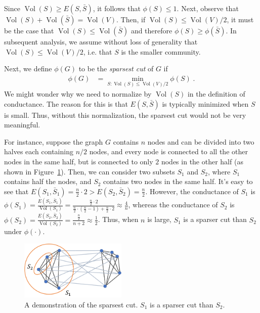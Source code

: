Since $\operatorname{Vol}(S) \geq E(S, \bar{S})$, it follows that $\phi(S) \leq 1$. Next, observe that $\operatorname{Vol}(S) + \operatorname{Vol}(\bar{S}) = \operatorname{Vol}(V)$. Then, if $\operatorname{Vol}(S) \leq \operatorname{Vol}(V)/2$, it must be the case that $\operatorname{Vol}(S) \leq \operatorname{Vol}(\bar{S})$ and therefore $\phi(S) \geq \phi(\bar{S})$. In subsequent analysis, we assume without loss of generality that $\operatorname{Vol}(S) \leq \operatorname{Vol}(V)/2$, i.e. that $S$ is the smaller community.

Next, we define $\phi(G)$ to be the {\it sparsest cut} of $G$ if
\begin{align}
    \phi(G) &= \min_{S: \operatorname{Vol}(S) \leq \operatorname{Vol}(V)/2} \phi(S) \;.
\end{align}
We might wonder why we need to normalize by $\operatorname{Vol}(S)$ in the definition of conductance. The reason for this is that $E(S, \bar{S})$ is typically minimized when $S$ is small. Thus, without this normalization, the sparsest cut would not be very meaningful.

For instance, suppose the graph $G$ contains $n$ nodes and can be divided into two halves each containing $n/2$ nodes, and every node is connected to all the other nodes in the same half, but is connected to only $2$ nodes in the other half (as shown in Figure~\ref{fig:ssl1}). Then, we can consider two subsets $S_1$ and $S_2$, where $S_1$ contains half the nodes, and $S_2$ contains two nodes in the same half. It's easy to see that $E(S_1, \bar{S}_1) = \frac{n}{2}\cdot 2 > E(S_2, \bar{S}_2) = \frac{n}{2}$. However, the conductance of $S_1$ is $\phi(S_1) = \frac{E(S_1, \bar{S}_1)}{\operatorname{Vol}(S_1)} = \frac{\frac{n}{2}\cdot 2}{\frac{n}{2}\cdot(\frac{n}{2}-1)+\frac{n}{2}\cdot 2}\approx\frac{4}{n}$, whereas the conductance of $S_2$ is $\phi(S_2) = \frac{E(S_2, \bar{S}_2)}{\operatorname{Vol}(S_2)}=\frac{\frac{n}{2}}{n+2} \approx\frac{1}{2}$. Thus, when $n$ is large, $S_1$ is a sparser cut than $S_2$ under $\phi(\cdot)$. 


\begin{figure}[ht]
	\centering
	\includegraphics[width=2in]{figures/ssl3.pdf}
	\caption{A demonstration of the sparsest cut. $S_1$ is a sparser cut than $S_2$.}
	\label{fig:ssl1}
\end{figure}


